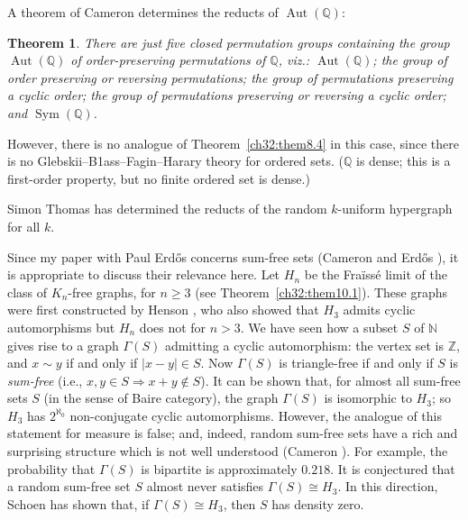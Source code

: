 \documentclass[12pt]{article}
\newtheorem{theorem}{Theorem}
\DeclareMathOperator{\Sym}{Sym}
\DeclareMathOperator{\Aut}{Aut}
\begin{document}
A theorem of Cameron \cite{ch32:bib4} determines the reducts of
$\Aut(\mathbb{Q})$:

\begin{theorem}\label{ch32:them10.2} 
There are just five closed permutation groups
containing the group $\Aut(\mathbb{Q})$ of order-preserving
permutations of $\mathbb{Q}$, viz.: $\Aut(\mathbb{Q})$; the group of
order preserving or reversing permutations; the group of
permutations preserving a cyclic order; the group of permutations
preserving or reversing a cyclic order; and $\Sym(\mathbb{Q})$.
\end{theorem}

However, there is no analogue of Theorem~\ref{ch32:them8.4} in this
case, since there is no Glebskii--B1ass--Fagin--Harary theory for
ordered sets. ($\mathbb{Q}$ is dense; this is a first-order property,
but no finite ordered set is dense.)

Simon Thomas \cite{ch32:new15} has determined the reducts of the random
$k$-uniform hypergraph for all $k$.

Since my paper with Paul Erd\H{o}s concerns sum-free sets (Cameron
and Erd\H{o}s \cite{ch32:bib8}), it is appropriate to discuss their
relevance here. Let $H_n$ be the Fra\"{i}ss\'{e} limit of the class
of $K_n$-free graphs, for $n \geq 3$ (see
Theorem~\ref{ch32:them10.1}). These graphs were first constructed
by Henson \cite{ch32:bib26}, who also showed that $H_3$ admits
cyclic automorphisms but $H_n$ does not for $n > 3$. We have seen
how a subset $S$ of $\mathbb{N}$ gives rise to a graph $\Gamma(S)$
admitting a cyclic automorphism: the vertex set is $\mathbb{Z}$, and
$x \sim y$ if and only if $|x - y|\in S$. Now $\Gamma(S)$ is
triangle-free if and only if $S$ is \emph{sum-free} (i.e., $x,y
\in S \Rightarrow x + y \notin S$). It can be shown that, for almost
all sum-free sets $S$ (in the sense of Baire category), the graph
$\Gamma(S)$ is isomorphic to $H_3$; so $H_3$ has $2^{\aleph_0}$
non-conjugate cyclic automorphisms. However, the analogue of this
statement for measure is false; and, indeed, random sum-free sets
have a rich and surprising structure which is not well understood
(Cameron \cite{ch32:bib5}). For example, the probability that
$\Gamma(S)$ is bipartite is approximately $0.218$. It is conjectured
that a random sum-free set $S$ almost never satisfies $\Gamma(S)\cong H_3$.
In this direction, Schoen \cite{ch32:new14} has shown that, if
$\Gamma(S)\cong H_3$, then $S$ has density zero.
\end{document}
